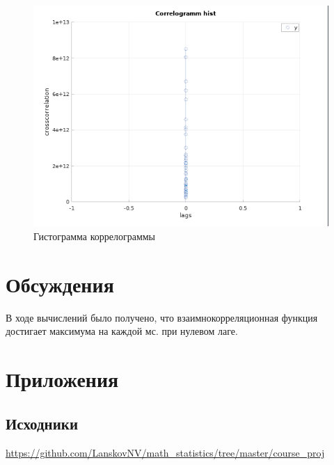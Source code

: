 \documentclass[12pt]{article}
\begin{document}
\begin{figure}[H]
\caption{Гистограмма коррелограммы}
\begin{center}
\includegraphics[scale = 0.9]{plot9.png} 
\end{center}
\end{figure}

\section{Обсуждения}

В ходе вычислений было получено, что взаимнокорреляционная функция достигает максимума на каждой мс. при нулевом лаге.

\section{Приложения}

\subsection{Исходники} 
\url{https://github.com/LanskovNV/math_statistics/tree/master/course_proj}

\newpage
\end{document}
